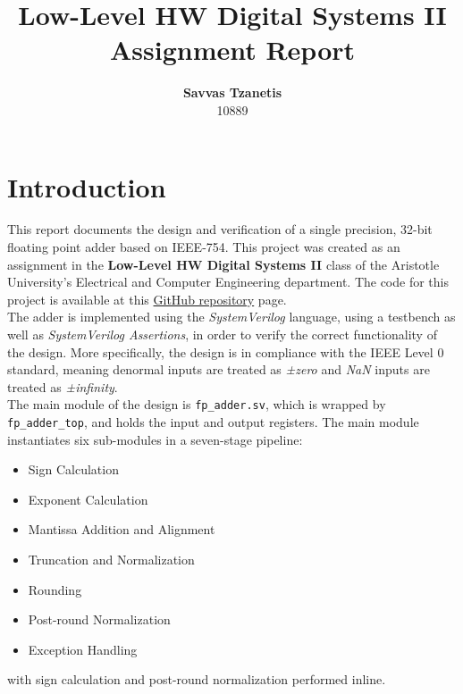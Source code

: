 \documentclass[12pt]{report}
\begin{document}
\title{\textbf{Low-Level HW Digital Systems II} \newline Assignment Report}
\author{\textbf{Savvas Tzanetis} \\ 10889}
\maketitle

\tableofcontents
\chapter{Introduction}
This report documents the design and verification of a single precision, 32-bit floating point adder based on IEEE-754. This project was created as an assignment in the \textbf{Low-Level HW Digital Systems II} class of the Aristotle University's Electrical and Computer Engineering department. The code for this project is available at this \textcolor{blue}{\href{https://github.com/stzanetis/FP32Adder}{GitHub repository}} page. \\

\noindent The adder is implemented using the \textit{SystemVerilog} language, using a testbench as well as \textit{SystemVerilog Assertions}, in order to verify the correct functionality of the design. More specifically, the design is in compliance with the IEEE Level 0 standard, meaning denormal inputs are treated as \textit{±zero} and \textit{NaN} inputs are treated as \textit{±infinity}. \\

\noindent The main module of the design is \lstinline{fp_adder.sv}, which is wrapped by \lstinline{fp_adder_top}, and holds the input and output registers. The main module instantiates six sub-modules in a seven-stage pipeline:

\begin{itemize}
    \item Sign Calculation
    \item Exponent Calculation
    \item Mantissa Addition and Alignment
    \item Truncation and Normalization
    \item Rounding
    \item Post-round Normalization
    \item Exception Handling
\end{itemize}

\noindent with sign calculation and post-round normalization performed inline.
\end{document}
